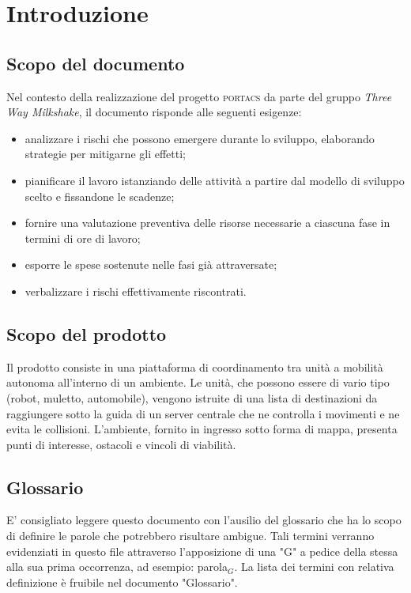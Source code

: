 \section{Introduzione}




\subsection{Scopo del documento}

Nel contesto della realizzazione del progetto \textsc{portacs} da parte del gruppo \textit{Three Way Milkshake}, il documento risponde alle seguenti esigenze: 
\begin{itemize}
	\item analizzare i rischi che possono emergere durante lo sviluppo, elaborando strategie per mitigarne gli effetti;
	\item pianificare il lavoro istanziando delle attività a partire dal modello di sviluppo scelto e fissandone le scadenze;
	\item fornire una valutazione preventiva delle risorse necessarie a ciascuna fase in termini di ore di lavoro;
	\item esporre le spese sostenute nelle fasi già attraversate;
	\item verbalizzare i rischi effettivamente riscontrati.
\end{itemize}



\subsection{Scopo del prodotto}
Il prodotto consiste in una piattaforma di coordinamento tra unità a mobilità autonoma all'interno di un ambiente. Le unità, che possono essere di vario tipo (robot, muletto, automobile), vengono istruite di una lista di destinazioni da raggiungere sotto la guida di un server centrale che ne controlla i movimenti e ne evita le collisioni. L'ambiente, fornito in ingresso sotto forma di mappa, presenta punti di interesse, ostacoli e vincoli di viabilità.



\subsection{Glossario}



E' consigliato leggere questo documento con l'ausilio del glossario che ha lo scopo di definire le parole che potrebbero risultare ambigue. Tali termini verranno evidenziati in questo file attraverso l'apposizione di una "G" a pedice della stessa alla sua prima occorrenza, ad esempio: parola$_G$.
La lista dei termini con relativa definizione è fruibile nel documento "Glossario".




